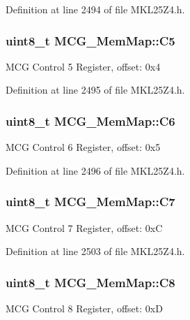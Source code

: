 Definition at line 2494 of file M\+K\+L25\+Z4.\+h.

\subsubsection[{\texorpdfstring{C5}{C5}}]{\setlength{\rightskip}{0pt plus 5cm}uint8\+\_\+t M\+C\+G\+\_\+\+Mem\+Map\+::\+C5}\hypertarget{struct_m_c_g___mem_map_a0e385950fe0f38c82eae57eb4ea2aaf3}{}\label{struct_m_c_g___mem_map_a0e385950fe0f38c82eae57eb4ea2aaf3}
M\+CG Control 5 Register, offset\+: 0x4 

Definition at line 2495 of file M\+K\+L25\+Z4.\+h.

\subsubsection[{\texorpdfstring{C6}{C6}}]{\setlength{\rightskip}{0pt plus 5cm}uint8\+\_\+t M\+C\+G\+\_\+\+Mem\+Map\+::\+C6}\hypertarget{struct_m_c_g___mem_map_ae7f9f9ae65de91e230a236ca4629380c}{}\label{struct_m_c_g___mem_map_ae7f9f9ae65de91e230a236ca4629380c}
M\+CG Control 6 Register, offset\+: 0x5 

Definition at line 2496 of file M\+K\+L25\+Z4.\+h.

\subsubsection[{\texorpdfstring{C7}{C7}}]{\setlength{\rightskip}{0pt plus 5cm}uint8\+\_\+t M\+C\+G\+\_\+\+Mem\+Map\+::\+C7}\hypertarget{struct_m_c_g___mem_map_a7be430dafe8d0fddf4dbb83781946201}{}\label{struct_m_c_g___mem_map_a7be430dafe8d0fddf4dbb83781946201}
M\+CG Control 7 Register, offset\+: 0xC 

Definition at line 2503 of file M\+K\+L25\+Z4.\+h.

\subsubsection[{\texorpdfstring{C8}{C8}}]{\setlength{\rightskip}{0pt plus 5cm}uint8\+\_\+t M\+C\+G\+\_\+\+Mem\+Map\+::\+C8}\hypertarget{struct_m_c_g___mem_map_a346a8b8c5c2c675e6297aaa1f14798df}{}\label{struct_m_c_g___mem_map_a346a8b8c5c2c675e6297aaa1f14798df}
M\+CG Control 8 Register, offset\+: 0xD 

